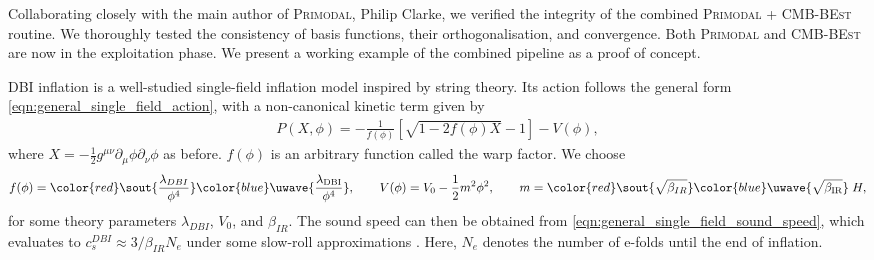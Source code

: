 \documentclass[a4paper,12pt,times,custombib,print,index]{Classes/PhDThesisPSnPDF} %
\providecommand{\DIFadd}[1]{{\protect\color{blue}\uwave{#1}}} %
\providecommand{\DIFdel}[1]{{\protect\color{red}\sout{#1}}}                      %
\providecommand{\DIFaddbegin}{} %
\providecommand{\DIFaddend}{} %
\providecommand{\DIFdelbegin}{} %
\providecommand{\DIFdelend}{} %
\newcommand{\DIFscaledelfig}{0.5}
\newlength{\DIFdelgraphicswidth} %
\newlength{\DIFdelgraphicsheight} %
\newcommand{\DIFaddincludegraphics}[2][]{{\color{blue}\fbox{\DIFOincludegraphics[#1]{#2}}}} %
\newcommand{\DIFdelincludegraphics}[2][]{%
\sbox{\DIFdelgraphicsbox}{\DIFOincludegraphics[#1]{#2}}%
\settoboxwidth{\DIFdelgraphicswidth}{\DIFdelgraphicsbox} %
\settoboxtotalheight{\DIFdelgraphicsheight}{\DIFdelgraphicsbox} %
\scalebox{\DIFscaledelfig}{%
\parbox[b]{\DIFdelgraphicswidth}{\usebox{\DIFdelgraphicsbox}\\[-\baselineskip] \rule{\DIFdelgraphicswidth}{0em}}\llap{\resizebox{\DIFdelgraphicswidth}{\DIFdelgraphicsheight}{%
\setlength{\unitlength}{\DIFdelgraphicswidth}%
\begin{picture}(1,1)%
\thicklines\linethickness{2pt} %
{\color[rgb]{1,0,0}\put(0,0){\framebox(1,1){}}}%
{\color[rgb]{1,0,0}\put(0,0){\line( 1,1){1}}}%
{\color[rgb]{1,0,0}\put(0,1){\line(1,-1){1}}}%
\end{picture}%
}\hspace*{3pt}}} %
} %
\DeclareRobustCommand{\DIFaddbegin}{\DIFOaddbegin \let\includegraphics\DIFaddincludegraphics} %
\DeclareRobustCommand{\DIFaddend}{\DIFOaddend \let\includegraphics\DIFOincludegraphics} %
\DeclareRobustCommand{\DIFdelbegin}{\DIFOdelbegin \let\includegraphics\DIFdelincludegraphics} %
\DeclareRobustCommand{\DIFdelend}{\DIFOaddend \let\includegraphics\DIFOincludegraphics} %
\begin{document}
Collaborating closely with the main author of \textsc{Primodal}, Philip Clarke, we verified the integrity of the combined \textsc{Primodal} + \textsc{CMB-BEst} routine. We thoroughly tested the consistency of basis functions, their orthogonalisation, and convergence. Both \textsc{Primodal} and \textsc{CMB-BEst} are now in the exploitation phase. We present a working example of the combined pipeline as a proof of concept.

DBI inflation \cite{Silverstein2004dbi,Alishahiha2004dbi,Chen2005runningdbi,Bean2008comparingdbi} is a well-studied single-field inflation model inspired by string theory. Its action follows the general form \eqref{eqn:general_single_field_action}, with a non-canonical kinetic term given by
\begin{align}
	P(X,\phi) = - \frac{1}{f(\phi)} \left[ \sqrt{1 - 2f(\phi)X} - 1 \right] - V(\phi),
\end{align}
where $X=-\frac{1}{2} g^{\mu\nu} \partial_\mu \phi \partial_\nu \phi$ as before. $f(\phi)$ is an arbitrary function called the warp factor. We choose
\begin{align}
	f(\phi) = \DIFdelbegin \DIFdel{\frac{\lambda_{DBI}}{\phi^4}}\DIFdelend \DIFaddbegin \DIFadd{\frac{\lambda_\text{DBI}}{\phi^4}}\DIFaddend , \qquad V(\phi) = V_0 - \frac{1}{2}m^2\phi^2, \qquad m = \DIFdelbegin \DIFdel{\sqrt{\beta_{IR}} }\DIFdelend \DIFaddbegin \DIFadd{\sqrt{\beta_\text{IR}} }\DIFaddend \; H,
\end{align}
for some theory parameters \DIFdelbegin \DIFdel{$\lambda_{DBI}$}\DIFdelend \DIFaddbegin \DIFadd{$\lambda_\text{DBI}$}\DIFaddend , $V_0$, and \DIFdelbegin \DIFdel{$\beta_{IR}$}\DIFdelend \DIFaddbegin \DIFadd{$\beta_\text{IR}$}\DIFaddend . The sound speed can then be obtained from \eqref{eqn:general_single_field_sound_speed}, which evaluates to \DIFdelbegin \DIFdel{$c^{DBI}_s \approx 3/\beta_{IR} N_e$ }\DIFdelend \DIFaddbegin \DIFadd{$c^\text{DBI}_\text{s} \approx 3/\beta_\text{IR} N_e$ }\DIFaddend under some slow-roll approximations \cite{Chen2005runningdbi}. Here, $N_e$ denotes the number of e-folds until the end of inflation.
\end{document}
